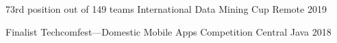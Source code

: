 




\begin{cvhonors}


\cvhonor
{73rd position out of 149 teams} %
{International Data Mining Cup} %
{Remote} %
{2019} %








\cvhonor
{Finalist} %
{Techcomfest---Domestic Mobile Apps Competition} %
{Central Java} %
{2018} %






\end{cvhonors}
